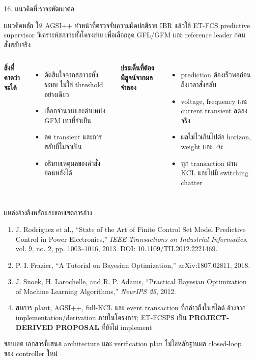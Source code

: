 \documentclass[aspectratio=169,12pt]{beamer}
\begin{document}
\begin{frame}{16. แนวคิดที่เราจะพัฒนาต่อ}
\begin{block}{แนวคิดหลัก}
ให้ AGSI++ ทำหน้าที่ตรวจจับความผิดปกติราย IBR แล้วใช้ ET-FCS predictive supervisor วิเคราะห์สภาวะทั้งโครงข่าย เพื่อเลือกชุด GFL/GFM และ reference leader ก่อนสั่งสลับจริง
\end{block}
\begin{columns}[T,onlytextwidth]
\textbf{สิ่งที่คาดว่าจะได้}
\begin{itemize}
  \item ตัดสินใจจากสภาวะทั้งระบบ ไม่ใช่ threshold อย่างเดียว
  \item เลือกจำนวนและตำแหน่ง GFM เท่าที่จำเป็น
  \item ลด transient และการสลับที่ไม่จำเป็น
  \item อธิบายเหตุผลของคำสั่งย้อนหลังได้
\end{itemize}
\textbf{ประเด็นที่ต้องพิสูจน์จากผลจำลอง}
\begin{itemize}
  \item prediction ต้องเร็วพอก่อนถึงเวลาสั่งสลับ
  \item voltage, frequency และ current transient ลดลงจริง
  \item ผลไม่ไวเกินไปต่อ horizon, weight และ $\Delta t$
  \item ทุก transaction ผ่าน KCL และไม่มี switching chatter
\end{itemize}
\end{columns}
\end{frame}

\begin{frame}{แหล่งอ้างอิงหลักและขอบเขตการอ้าง}
\small
\begin{enumerate}
  \item J. Rodriguez et al., ``State of the Art of Finite Control Set Model Predictive Control in Power Electronics,'' \emph{IEEE Transactions on Industrial Informatics}, vol. 9, no. 2, pp. 1003--1016, 2013. DOI: 10.1109/TII.2012.2221469.
  \item P. I. Frazier, ``A Tutorial on Bayesian Optimization,'' arXiv:1807.02811, 2018.
  \item J. Snoek, H. Larochelle, and R. P. Adams, ``Practical Bayesian Optimization of Machine Learning Algorithms,'' \emph{NeurIPS 25}, 2012.
  \item สมการ plant, AGSI++, full-KCL และ event transaction ที่กล่าวถึงในสไลด์ อ้างจาก implementation/derivation ภายในโครงการ; ET-FCSPS เป็น \textbf{PROJECT-DERIVED PROPOSAL} ที่ยังไม่ implement
\end{enumerate}
\vspace{.4cm}
\begin{block}{ขอบเขต}
เอกสารนี้เสนอ architecture และ verification plan ไม่ใช่หลักฐานผล closed-loop ของ controller ใหม่
\end{block}
\end{frame}
\end{document}
